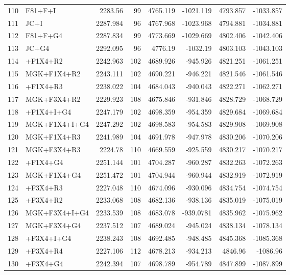 \documentclass[12pt]{article}
\begin{document}
\begin{longtable}{clrrrrrr}
	110 & F81+F+I & 2283.56 & 99 & 4765.119 & -1021.119 & 4793.857 & -1033.857 \\ 
	111 & JC+I & 2287.984 & 96 & 4767.968 & -1023.968 & 4794.881 & -1034.881 \\ 
	112 & F81+F+G4 & 2287.834 & 99 & 4773.669 & -1029.669 & 4802.406 & -1042.406 \\ 
	113 & JC+G4 & 2292.095 & 96 & 4776.19 & -1032.19 & 4803.103 & -1043.103 \\ 
	114 & \gy+F1X4+R2 & 2242.963 & 102 & 4689.926 & -945.926 & 4821.251 & -1061.251 \\ 
	115 & MGK+F1X4+R2 & 2243.111 & 102 & 4690.221 & -946.221 & 4821.546 & -1061.546 \\ 
	116 & \gy+F1X4+R3 & 2238.022 & 104 & 4684.043 & -940.043 & 4822.271 & -1062.271 \\ 
	117 & MGK+F3X4+R2 & 2229.923 & 108 & 4675.846 & -931.846 & 4828.729 & -1068.729 \\ 
	118 & \gy+F1X4+I+G4 & 2247.179 & 102 & 4698.359 & -954.359 & 4829.684 & -1069.684 \\ 
	119 & MGK+F1X4+I+G4 & 2247.292 & 102 & 4698.583 & -954.583 & 4829.908 & -1069.908 \\ 
	120 & MGK+F1X4+R3 & 2241.989 & 104 & 4691.978 & -947.978 & 4830.206 & -1070.206 \\ 
	121 & MGK+F3X4+R3 & 2224.78 & 110 & 4669.559 & -925.559 & 4830.217 & -1070.217 \\ 
	122 & \gy+F1X4+G4 & 2251.144 & 101 & 4704.287 & -960.287 & 4832.263 & -1072.263 \\ 
	123 & MGK+F1X4+G4 & 2251.472 & 101 & 4704.944 & -960.944 & 4832.919 & -1072.919 \\ 
	124 & \gy+F3X4+R3 & 2227.048 & 110 & 4674.096 & -930.096 & 4834.754 & -1074.754 \\ 
	125 & \gy+F3X4+R2 & 2233.068 & 108 & 4682.136 & -938.136 & 4835.019 & -1075.019 \\ 
	126 & MGK+F3X4+I+G4 & 2233.539 & 108 & 4683.078 & -939.0781 & 4835.962 & -1075.962 \\ 
	127 & MGK+F3X4+G4 & 2237.512 & 107 & 4689.024 & -945.024 & 4838.134 & -1078.134 \\ 
	128 & \gy+F3X4+I+G4 & 2238.243 & 108 & 4692.485 & -948.485 & 4845.368 & -1085.368 \\ 
	129 & \gy+F3X4+R4 & 2227.106 & 112 & 4678.213 & -934.213 & 4846.96 & -1086.96 \\ 
	130 & \gy+F3X4+G4 & 2242.394 & 107 & 4698.789 & -954.789 & 4847.899 & -1087.899 \\ 

\end{longtable}
\end{document}
